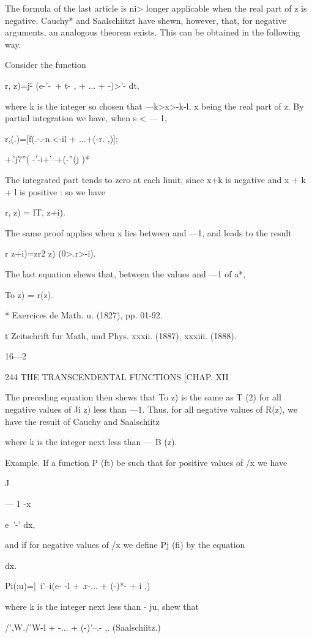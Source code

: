 The formula of the last article is ni> longer applicable when the real
part of z is negative. Cauchy* and Saalschiitzt have shewn, however,
that, for negative arguments, an analogous theorem exists. This can be
obtained in the following way.

Consider the function

r, z)=j\'- (e-'-\ + t- , + ... + -)>'- dt,

where k is the integer so chosen that —k>x>-k-l, x being the real part
of z. By partial integration we have, when s < — 1,

r,(.)=[f(.-.-n.<-il + ...+(-r. ,)];

+.'j7''( -'-i+'--+(-''(j )*

The integrated part tends to zero at each limit, since x+k is negative
and x + k + l is positive : so we have

r, z) = lT, z+i).

The same proof applies when x lies between and —1, and leads to the
result

r z+i)=zr2 z) (0>.r>-i).

The last equation shews that, between the values and —1 of a*,

To z) = r(z).

* Exercices de Math. u. (1827), pp. 01-92.

t Zeitschrift fur Math, und Phys. xxxii. (1887), xxxiii. (1888).

16—2

244 THE TRANSCENDENTAL FUNCTIONS [CHAP. XII

The preceding equation then shews that To z) is the same as T (2) for
all negative values of Ji z) less than —1. Thus, for all negative
values of R(z), we have the result of Cauchy and Saalschiitz

where k is the integer next less than — B (z).

Example. If a function P (ft) be such that for positive values of /x
we have

J

— 1 -x

e~'-' dx,

and if for negative values of /x we define Pj (fi) by the equation

dx.

Pi(;u)=|\ i'--i(e- -l + .r-... + (-)*- + i ,)

where k is the integer next less than - ju, shew that

/',W./'W-l + -... + (-)'--.- ,. (Saalschiitz.)

